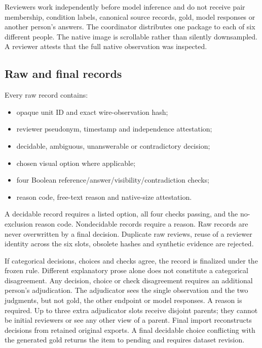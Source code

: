 \documentclass[10pt,twocolumn,letterpaper]{article}
\begin{document}
Reviewers work independently before model inference and do not receive
pair membership, condition labels, canonical source records, gold,
model responses or another person's answers. The coordinator distributes
one package to each of six different people. The native image is
scrollable rather than silently downsampled. A reviewer attests that
the full native observation was inspected.

\subsection{Raw and final records}
Every raw record contains:
\begin{itemize}\setlength\itemsep{1pt}
\item opaque unit ID and exact wire-observation hash;
\item reviewer pseudonym, timestamp and independence attestation;
\item decidable, ambiguous, unanswerable or contradictory decision;
\item chosen visual option where applicable;
\item four Boolean reference/answer/visibility/contradiction checks;
\item reason code, free-text reason and native-size attestation.
\end{itemize}
A decidable record requires a listed option, all four checks passing,
and the no-exclusion reason code. Nondecidable records require a
reason. Raw records are never overwritten by a final decision.
Duplicate raw reviews, reuse of a reviewer identity across the six
slots, obsolete hashes and synthetic evidence are rejected.

If categorical decisions, choices and checks agree, the record is
finalized under the frozen rule. Different explanatory prose alone
does not constitute a categorical disagreement. Any decision, choice
or check disagreement requires an additional person's adjudication.
The adjudicator sees the single observation and the two judgments,
but not gold, the other endpoint or model responses. A reason is
required. Up to three extra adjudicator slots receive disjoint parents;
they cannot be initial reviewers or see any other view of a parent.
Final import reconstructs decisions from retained original exports.
A final decidable choice conflicting with the generated
gold returns the item to pending and requires dataset revision.
\end{document}
